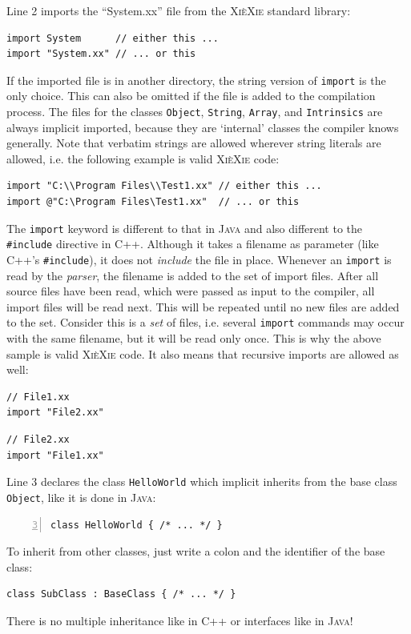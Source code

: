 \documentclass{report}
\def\xiexie{\textsc{Xi\`eXie}\xspace}
\def\cpp{\textsc{C++}\xspace}
\def\java{\textsc{Java}\xspace}
\begin{document}
Line 2 imports the ``System.xx'' file from the \xiexie standard library:
\begin{lstlisting}
import System      // either this ...
import "System.xx" // ... or this
\end{lstlisting}
If the imported file is in another directory, the string version of \texttt{import} is the only choice.
This can also be omitted if the file is added to the compilation process.
The files for the classes \texttt{Object}, \texttt{String}, \texttt{Array}, and \texttt{Intrinsics}
are always implicit imported, because they are `internal' classes the compiler knows generally.
Note that verbatim strings are allowed wherever string literals are allowed, i.e. the following example is valid \xiexie code:
\begin{lstlisting}
import "C:\\Program Files\\Test1.xx" // either this ...
import @"C:\Program Files\Test1.xx"  // ... or this
\end{lstlisting}
The \texttt{import} keyword is different to that in \java and also different to the \texttt{\#include} directive in \cpp.
Although it takes a filename as parameter (like \cpp's \texttt{\#include}), it does not \textit{include} the file in place.
Whenever an \texttt{import} is read by the \textit{parser}, the filename is added to the set of import files.
After all source files have been read, which were passed as input to the compiler, all import files will be read next.
This will be repeated until no new files are added to the set.
Consider this is a \textit{set} of files, i.e. several \texttt{import} commands may occur with the same filename,
but it will be read only once. This is why the above sample is valid \xiexie code. It also means that recursive imports
are allowed as well:
\begin{lstlisting}
// File1.xx
import "File2.xx"
\end{lstlisting}
\begin{lstlisting}
// File2.xx
import "File1.xx"
\end{lstlisting}

Line 3 declares the class \texttt{HelloWorld} which implicit inherits from the base class \texttt{Object},
like it is done in \java:
\begin{lstlisting}[numbers=left, firstnumber=3]
class HelloWorld { /* ... */ }
\end{lstlisting}
To inherit from other classes, just write a colon and the identifier of the base class:
\begin{lstlisting}
class SubClass : BaseClass { /* ... */ }
\end{lstlisting}
There is no multiple inheritance like in \cpp or interfaces like in \java!
\end{document}
